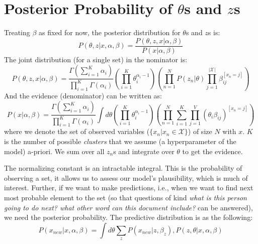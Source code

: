 \documentclass{article}%
\begin{document}
\section{Posterior Probability of  $\theta$s and $z$s}
Treating $\beta$ as fixed for now, the posterior distribution for $\theta$s and $z$s is:
\begin{equation*}
P(\theta, z|x, \alpha, \beta) = \frac{P(\theta, z, x|\alpha, \beta)}{P(x|\alpha, \beta)}
\end{equation*}
The joint distribution (for a single set) in the nominator is:
\begin{equation*}
P(\theta, z, x|\alpha, \beta) = \frac{\Gamma(\sum_{i=1}^K \alpha_i)}{\prod_{i=1}^K\Gamma(\alpha_i)} \left(\prod_{i=1}^K \theta_i^{\alpha_i -1} \right) \left(\prod_{n=1}^N P(z_n|\theta)\prod_{j=1}^{|
\mathcal{X}|}\beta_{ij}^{[x_n = j]}\right)
\end{equation*}
And the evidence (denominator) can be written as:
\begin{equation*}
P(x|\alpha, \beta) = \frac{\Gamma(\sum_{i=1}^K \alpha_i)}{\prod_{i=1}^K\Gamma(\alpha_i)} \int d\theta \left(\prod_{i=1}^K \theta_i^{\alpha_i -1} \right) \left(\prod_{n=1}^N\sum_{i=1}^K\prod_{j=1}^V(\theta_i\beta_{ij})^{[x_n = j]}\right)
\end{equation*}
where we denote the set of observed variables ($\{x_n| x_n\in \mathcal{X}\}$) of size $N$ with $x$. $K$ is the number of possible \textit{clusters} that we assume (a hyperparameter of the model) a-priori. We sum over all $z_n$s and integrate over $\theta$ to get the evidence.

The normalizing constant is an intractable integral. This is the probability of observing a set, it allows us to assess our model's plausibility, which is much of interest. Further, if we want to make predictions, i.e., when we want to find next most probable element to the set (so that questions of kind \textit{what is this person going to do next? what other word can this document include?} can be answered), we need the posterior probability. The predictive distribution is as the following:
\begin{equation*}
P(x_{new}|x, \alpha, \beta) = \int d\theta \sum_z P(x_{new}|z, \beta_z), P(z, \theta|x, \alpha, \beta)
\end{equation*}
\end{document}
